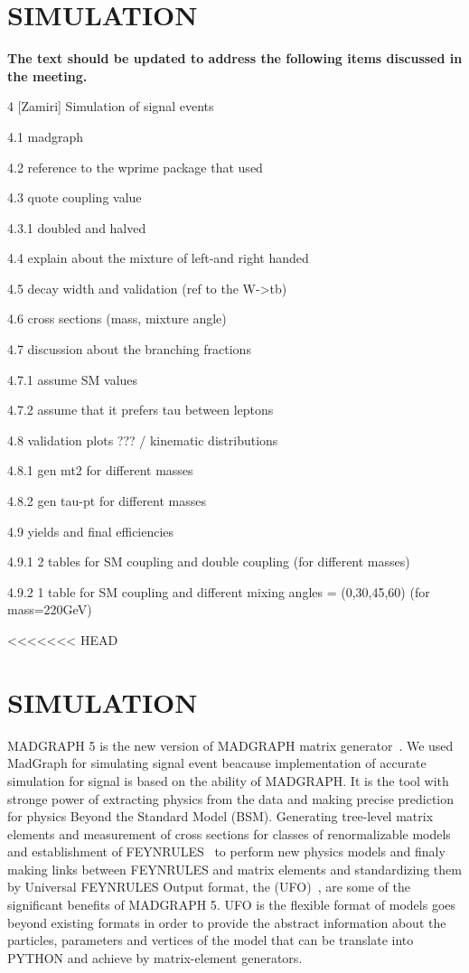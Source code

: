 \section{SIMULATION}\label{sec:simulation}

{\bf The text should be updated to address the following items discussed in the meeting.}

4 [Zamiri] Simulation of signal events

4.1 madgraph

4.2 reference to the wprime package that used

4.3 quote coupling value

4.3.1 doubled and halved

4.4 explain about the mixture of left-and right handed

4.5 decay width and validation (ref to the W->tb)

4.6 cross sections (mass, mixture angle)

4.7 discussion about the branching fractions

4.7.1 assume SM values

4.7.2 assume that it prefers tau between leptons

4.8 validation plots ??? / kinematic distributions

4.8.1 gen mt2 for different masses

4.8.2 gen tau-pt for different masses

4.9 yields and final efficiencies

4.9.1 2 tables for SM coupling and double coupling (for different masses)

4.9.2 1 table for SM coupling and different mixing angles = (0,30,45,60) (for mass=220GeV)

<<<<<<< HEAD
\section{SIMULATION}\label{sec:evo}
  {\small MADGRAPH 5} is the new version of {\small MADGRAPH} matrix generator~\cite{Alwall:2011uj}. We used MadGraph for simulating signal event beacause implementation of accurate simulation for signal is based on the ability of {\small MADGRAPH}. It is the tool with stronge power of extracting physics from the data and making precise prediction for physics Beyond the Standard Model {\small (BSM)}. Generating tree-level matrix elements and measurement of cross sections for classes of renormalizable models and establishment of {\small FEYNRULES}~\cite{Christensen:2008py} to perform new physics models and finaly making links between {\small FEYNRULES} and matrix elements and standardizing them by Universal F{\small EYNRULES} Output format, the {\small (UFO)}~\cite{Degrande:2011ua}, are some of the significant benefits of {\small MADGRAPH 5}. {\small UFO} is the flexible format of models goes beyond existing formats in order to provide the abstract information about the particles, parameters and vertices of the model that can be translate into {\small PYTHON} and achieve by matrix-element generators. 
 
